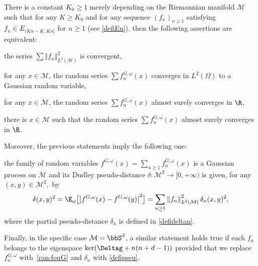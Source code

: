 \begin{prop}\label{con-nec}
There is a constant $K_0\geq 1$ merely depending on the Riemannian manifold $\mathcal{M}$ such that for any $K \geq K_0$ and for any sequence $(f_n)_{n\geq 1}$ satisfying $f_n\in E_{(Kn-K,Kn]}$ for $n\geq 1$ (see \eqref{defiEn}), then the following assertions are equivalent:
\begin{enumeratei}
\item\label{con-neci} the series $\sum \left\Vert f_n \right\Vert_{L^2(\mathcal{M})}^2$ is convergent,
\item\label{con-necii} for any $x\in \mathcal{M}$, the random series $\sum f_n^{G,\omega}(x)$ converges in $L^2(\Omega)$ to a Gaussian random variable,
\item\label{con-neciii} for any $x\in \mathcal{M}$, the random series $\sum f_n^{G,\omega}(x)$ almost surely converges in $\R$,
\item\label{con-neciv} there is $x\in \mathcal{M}$ such that the random series $\sum f_n^{G,\omega}(x)$ almost surely converges in $\R$.
\end{enumeratei}
\noindent
Moreover, the previous statements imply the following one:
\begin{enumeratei}\setcounter{enumi}{4}
\item\label{con-necv}
the family of random variables
$f^{G,\omega}(x)=\sum_{n\geq 1} f_n^{G,\omega}(x)$ is a Gaussian process on $\mathcal{M}$ and its Dudley pseudo-distance $\delta:\mathcal{M}^2\!\to\! [0,+\infty)$ is given, for any $(x,y)\!\in\!\mathcal{M}^2$,~by%
\begin{equation}\label{ddu}
\delta(x,y)^2=\E_{\omega}\bigl[\left\vert f^{G,\omega}(x)-f^{G,\omega}(y) \right\vert^2\bigr]=\sum_{n\geq 1} \left\Vert f_n \right\Vert_{L^2(\mathcal{M})}^2 \delta_n(x,y)^2,
\end{equation}
where the partial pseudo-distance $\delta_n$ is defined in \eqref{defideltan}.
\end{enumeratei}
Finally, in the specific case $\mathcal{M}=\bbS^d$, a similar statement holds true if each $f_n$ belongs to the eigenspace $\ker(\Deltag+n(n+d-1))$ provided that we replace $f_n^{G,\omega}$ with~\eqref{ran-fouG} and $\delta_n$ with \eqref{defipseu}.
\end{prop}


